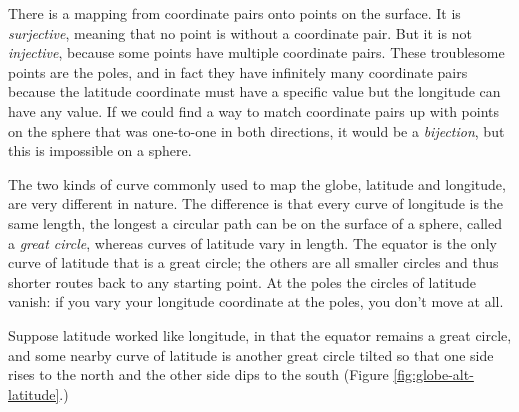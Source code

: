There is a mapping from coordinate pairs onto points on the surface. It is \textit{surjective}, meaning that no point is without a coordinate pair. But it is not \textit{injective}, because some points have multiple coordinate pairs. These troublesome points are the poles, and in fact they have infinitely many coordinate pairs because the latitude coordinate must have a specific value but the longitude can have any value. If we could find a way to match coordinate pairs up with points on the sphere that was one-to-one in both directions, it would be a \textit{bijection}, but this is impossible on a sphere.

The two kinds of curve commonly used to map the globe, latitude and longitude, are very different in nature. The difference is that every curve of longitude is the same length, the longest a circular path can be on the surface of a sphere, called a \textit{great circle}, whereas curves of latitude vary in length. The equator is the only curve of latitude that is a great circle; the others are all smaller circles and thus shorter routes back to any starting point. At the poles the circles of latitude vanish: if you vary your longitude coordinate at the poles, you don't move at all.

Suppose latitude worked like longitude, in that the equator remains a great circle, and some nearby curve of latitude is another great circle tilted so that one side rises to the north and the other side dips to the south (Figure \ref{fig:globe-alt-latitude}.)

